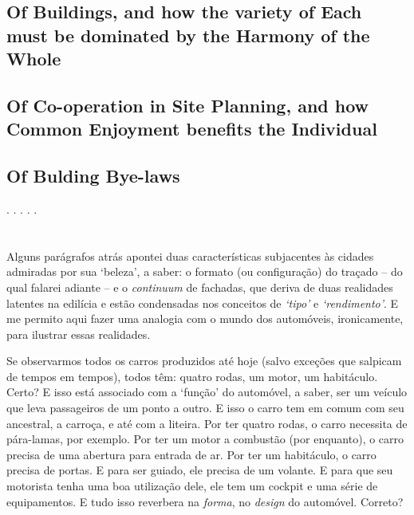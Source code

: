 \documentclass[12pt, a4paper]{book} %
\begin{document}
        \subsection*{Of Buildings, and how the variety of Each must be dominated by the Harmony of the Whole}
        \subsection*{Of Co-operation in Site Planning, and how Common Enjoyment benefits the Individual}
        \subsection*{Of Bulding Bye-laws}

        \begin{center}
            . . . . .
        \end{center} 

            \section{}%
            Alguns parágrafos atrás apontei duas características subjacentes às cidades admiradas por sua `beleza', a saber: o formato (ou configuração) do traçado – do qual falarei adiante – e o \textit{continuum} de fachadas, que deriva de duas realidades latentes na edilícia e estão condensadas nos conceitos de \emph{`tipo'} e \emph{`rendimento'}. E me permito aqui fazer uma analogia com o mundo dos automóveis, ironicamente, para ilustrar essas realidades.

            Se observarmos todos os carros produzidos até hoje (salvo exceções que salpicam de tempos em tempos), todos têm: quatro rodas, um motor, um habitáculo. Certo? E isso está associado com a `função' do automóvel, a saber, ser um veículo que leva passageiros de um ponto a outro. E isso o carro tem em comum com seu ancestral, a carroça, e até com a liteira. Por ter quatro rodas, o carro necessita de pára-lamas, por exemplo. Por ter um motor a combustão (por enquanto), o carro precisa de uma abertura para entrada de ar. Por ter um habitáculo, o carro precisa de portas. E para ser guiado, ele precisa de um volante. E para que seu motorista tenha uma boa utilização dele, ele tem um cockpit e uma série de equipamentos. E tudo isso reverbera na \textit{forma}, no \textit{design} do automóvel. Correto? 
\end{document}
